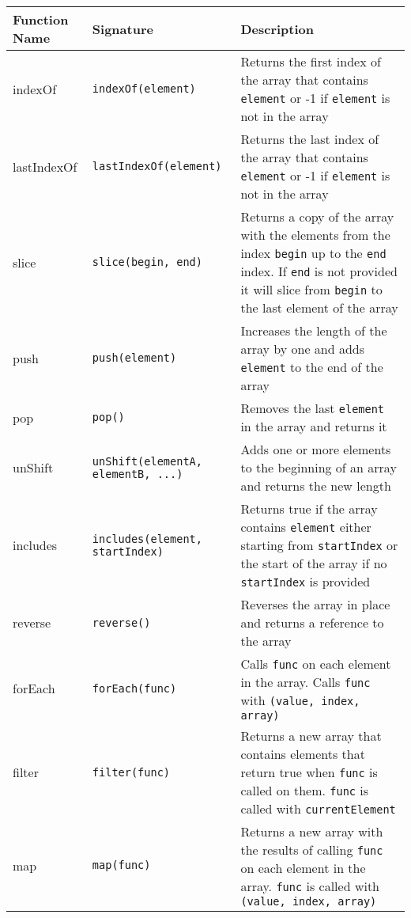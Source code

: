 \documentclass[]{final_report}
\begin{document}
\begin{table}[h]
\centering
\begin{tabular}{|p{2cm}|p{4.2cm}|p{9cm} |}
\hline
Function Name & Signature & Description \\ \hline
indexOf & {\lstinline|indexOf(element)|} & Returns the first index of the array that contains {\lstinline|element|} or -1 if {\lstinline|element|} is not in the array \\ \hline
lastIndexOf & {\lstinline|lastIndexOf(element)|} & Returns the last index of the array that contains {\lstinline|element|} or -1 if {\lstinline|element|} is not in the array \\ \hline
slice & {\lstinline|slice(begin, end)|} & Returns a copy of the array with the elements from the index {\lstinline|begin|} up to the {\lstinline|end|} index. If {\lstinline|end|} is not provided it will slice from {\lstinline|begin|} to the last element of the array \\ \hline
push & {\lstinline|push(element)|} & Increases the length of the array by one and adds {\lstinline|element|} to the end of the array \\ \hline
pop & {\lstinline|pop()|} & Removes the last {\lstinline|element|} in the array and returns it \\ \hline
unShift & {\lstinline|unShift(elementA, elementB, ...)|} & Adds one or more elements to the beginning of an array and returns the new length \\ \hline
includes & {\lstinline|includes(element, startIndex)|} & Returns true if the array contains {\lstinline|element|} either starting from {\lstinline|startIndex|} or the start of the array if no {\lstinline|startIndex|} is provided \\ \hline
reverse & {\lstinline|reverse()|} & Reverses the array in place and returns a reference to the array \\ \hline
forEach & {\lstinline|forEach(func)|} & Calls {\lstinline|func|} on each element in the array. Calls {\lstinline|func|} with {\lstinline|(value, index, array)|} \\ \hline
filter & {\lstinline|filter(func)|} & Returns a new array that contains elements that return true when {\lstinline|func|} is called on them. {\lstinline|func|} is called with {\lstinline|currentElement|} \\ \hline
map & {\lstinline|map(func)|} & Returns a new array with the results of calling {\lstinline|func|} on each element in the array. {\lstinline|func|} is called with {\lstinline|(value, index, array)|} \\ \hline

\end{tabular}
\end{table}
\end{document}
